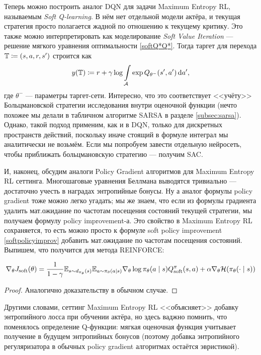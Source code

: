 Теперь можно построить аналог DQN для задачи Maximum Entropy RL, называемым \emph{Soft Q-learning}. В нём нет отдельной модели актёра, и текущая стратегия просто полагается жадной по отношению к текущему критику. Это также можно интерпретировать как моделирование \emph{Soft Value Iteration} --- решение мягкого уравнения оптимальности \eqref{softQ*Q*}. Тогда таргет для перехода $\mathbb{T} \coloneqq (s, a, r, s')$ строится как
$$y(\mathbb{T}) \coloneqq r + \gamma \log \int\limits_{\mathcal{A}} \exp Q_{\theta^{-}}(s', a') \mathop{}\!\mathrm{d} a',$$
где $\theta^{-}$ --- параметры таргет-сети. Интересно, что это соответствует <<учёту>> Больцмановской стратегии исследования внутри оценочной функции (нечто похожее мы делали в табличном алгоритме SARSA в разделе \ref{subsec:sarsa}). Однако, такой подход применим, как и в DQN, только для дискретных пространств действий, поскольку иначе стоящий в формуле интеграл мы аналитически не возьмём. Если мы попробуем завести отдельную нейросеть, чтобы приближать больцмановскую стратегию --- получим SAC.

И, наконец, обсудим аналоги Policy Gradient алгоритмов для Maximum Entropy RL сеттинга. Многошаговые уравнения Беллмана выводятся тривиально --- достаточно учесть в наградах энтропийные бонусы. Ну а аналог формулы policy gradient тоже можно легко угадать; мы же знаем, что если из формулы градиента удалить мат.ожидание по частотам посещения состояний текущей стратегии, мы получаем формулу policy improvement-а. Это свойство в Maximum Entropy RL сохраняется, то есть можно просто к формуле soft policy improvement \eqref{softpolicyimprov} добавить мат.ожидание по частотам посещения состояний. Выпишем, что получится для метода REINFORCE:

\begin{theorem}
$$\nabla_{\theta} J_{\mathrm{soft}}(\theta) = \frac{1}{1 - \gamma} \mathbb{E}_{s \sim d_{\pi_\theta}(s)} \mathbb{E}_{a \sim \pi_\theta(a \mid s)} \nabla_\theta \log \pi_\theta(a \mid s) Q^{\pi}_{\mathrm{soft}}(s, a) + \alpha \nabla_\theta \mathcal{H}(\pi_\theta(\cdot \mid s))$$
\begin{proof}
Аналогично доказательству в обычном случае.
\end{proof}
\end{theorem}

Другими словами, сеттинг Maximum Entropy RL <<объясняет>> добавку энтропийного лосса при обучении актёра, но здесь ваджно помнить, что поменялось определение Q-функции: мягкая оценочная функция учитывает получение в будущем энтропийных бонусов (поэтому добавка энтропийного регуляризатора в обычных policy gradient алгоритмах остаётся эвристикой). 




